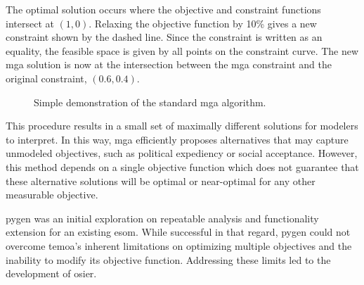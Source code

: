 The optimal solution occurs where the objective and constraint functions
intersect at $\left(1,0\right)$. Relaxing the objective function by 10\% gives a
new constraint shown by the dashed line. Since the constraint is written as an
equality, the feasible space is given by all points on the constraint curve. The
new \ac{mga} solution is now at the intersection between the \ac{mga} constraint and the
original constraint, $\left(0.6, 0.4\right)$.

\begin{figure}[h]
  \centering
  \resizebox{0.75\columnwidth}{!}{}
  \caption{Simple demonstration of the standard \ac{mga} algorithm.}
  \label{fig:standard_mga}
\end{figure}

This procedure results in a small set of maximally different solutions for
modelers to interpret. In this way, \ac{mga} efficiently proposes alternatives
that may capture unmodeled objectives, such as political expediency or social
acceptance. However, this method depends on a single objective function which
does not guarantee that these alternative solutions will be optimal or
near-optimal for any other measurable objective.


\ac{pygen} was an initial exploration on repeatable analysis and functionality
extension for an existing \ac{esom}. While successful in that regard, \ac{pygen}
could not overcome \ac{temoa}'s inherent limitations on optimizing multiple
objectives and the inability to modify its objective function. Addressing these
limits led to the development of \ac{osier}.


